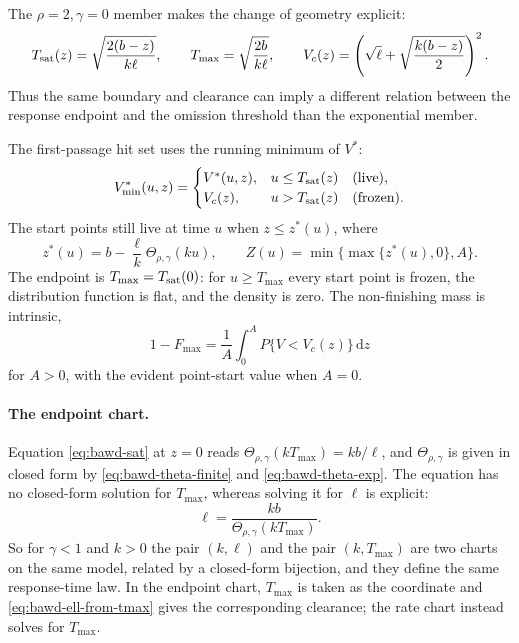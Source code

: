 \documentclass[12pt]{article}
\newcommand{\dd}{\,\mathrm{d}}
\theoremstyle{remark}
\begin{document}
The $\rho=2,\gamma=0$ member makes the change of geometry explicit:
\[
 T_{\rm sat}(z)=\sqrt{\frac{2(b-z)}{k\ell}},\qquad
 T_{\max}=\sqrt{\frac{2b}{k\ell}},\qquad
 V_c(z)=\left(\sqrt{\ell}+
       \sqrt{\frac{k(b-z)}{2}}\right)^2.
\]
Thus the same boundary and clearance can imply a different relation between the response endpoint and the omission threshold than the exponential member.

The first-passage hit set uses the running minimum of $V^*$:
\begin{equation}
 V^*_{\min}(u,z)=
 \begin{cases}
   V^*(u,z),&u\le T_{\rm sat}(z)\quad\text{(live)},\\
   V_c(z),&u>T_{\rm sat}(z)\quad\text{(frozen)}.
 \end{cases}
 \label{eq:bawd-minsplit}
\end{equation}
The start points still live at time $u$ when $z\le z^*(u)$, where
\begin{equation}
 z^*(u)=b-\frac{\ell}{k}\Theta_{\rho,\gamma}(ku),\qquad
 Z(u)=\min\{\max\{z^*(u),0\},A\}.
 \label{eq:bawd-Z}
\end{equation}
The endpoint is $T_{\max}=T_{\rm sat}(0)$: for $u\ge T_{\max}$ every start point is frozen, the distribution function is flat, and the density is zero. The non-finishing mass is intrinsic,
\begin{equation}
  1-F_{\max}
  =\frac{1}{A}\int_0^A P\{V<V_c(z)\}\dd z
 \label{eq:bawd-fmax}
\end{equation}
for $A>0$, with the evident point-start value when $A=0$.

\paragraph{The endpoint chart.} Equation \eqref{eq:bawd-sat} at $z=0$ reads
$\Theta_{\rho,\gamma}(kT_{\max}) = kb/\ell$, and $\Theta_{\rho,\gamma}$ is given in closed form by \eqref{eq:bawd-theta-finite} and
\eqref{eq:bawd-theta-exp}. The equation has no closed-form solution for
$T_{\max}$, whereas solving it for $\ell$ is explicit:
\begin{equation}
  \ell = \frac{kb}{\Theta_{\rho,\gamma}(kT_{\max})}.
  \label{eq:bawd-ell-from-tmax}
\end{equation}
So for $\gamma<1$ and $k>0$ the pair $(k,\ell)$ and the pair $(k,T_{\max})$ are two charts on the same model, related by a closed-form bijection, and they define the same response-time law. In the endpoint chart, $T_{\max}$ is taken as the coordinate and \eqref{eq:bawd-ell-from-tmax} gives the corresponding clearance; the rate chart instead solves for $T_{\max}$.
\end{document}
